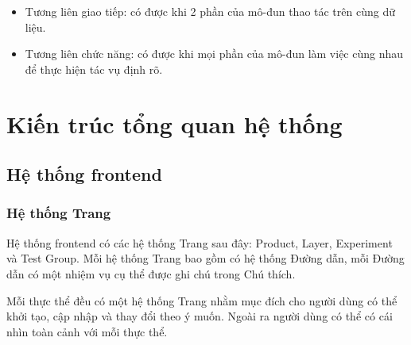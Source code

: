 \begin{itemize}
	\item Tương liên giao tiếp: có được khi 2 phần của mô-đun thao tác trên cùng dữ liệu.
	\item Tương liên chức năng: có được khi mọi phần của mô-đun làm việc cùng nhau để thực hiện tác vụ định rõ.
\end{itemize}

\section{Kiến trúc tổng quan hệ thống}

\subsection{Hệ thống frontend}

\subsubsection{Hệ thống Trang}

Hệ thống frontend có các hệ thống Trang sau đây: Product, Layer, Experiment và Test Group. Mỗi hệ thống Trang bao gồm có hệ thống Đường dẫn, mỗi Đường dẫn có một nhiệm vụ cụ thể được ghi chú trong Chú thích.

Mỗi thực thể đều có một hệ thống Trang nhằm mục đích cho người dùng có thể khởi tạo, cập nhập và thay đổi theo ý muốn. Ngoài ra người dùng có thể có cái nhìn toàn cảnh với mỗi thực thể.


